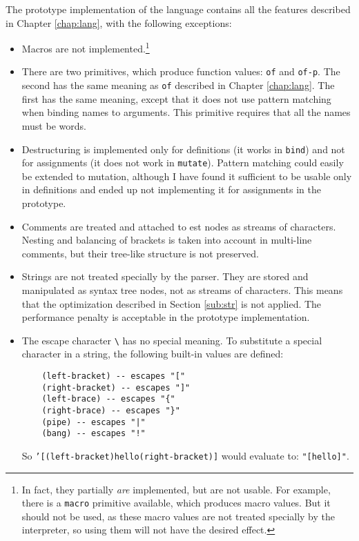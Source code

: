 The prototype implementation of the language contains all the features described in Chapter \ref{chap:lang}, with the following exceptions:
\begin{itemize}
    \item Macros are not implemented.\footnote{In fact, they partially \textit{are} implemented, but are not usable. For example, there is a \texttt{macro} primitive available, which produces macro values. But it should not be used, as these macro values are not treated specially by the interpreter, so using them will not have the desired effect.}
    \item There are two primitives, which produce function values: \texttt{of} and \texttt{of-p}. The second has the same meaning as \texttt{of} described in Chapter \ref{chap:lang}. The first has the same meaning, except that it does not use pattern matching when binding names to arguments. This primitive requires that all the names must be words.
    \item Destructuring is implemented only for definitions (it works in \texttt{bind}) and not for assignments (it does not work in \texttt{mutate}). Pattern matching could easily be extended to mutation, although I have found it sufficient to be usable only in definitions and ended up not implementing it for assignments in the prototype.
    \item Comments are treated and attached to \acrshort{est} nodes as streams of characters. Nesting and balancing of brackets is taken into account in multi-line comments, but their tree-like structure is not preserved.
    \item Strings are not treated specially by the parser. They are stored and manipulated as syntax tree nodes, not as streams of characters. This means that the optimization described in Section \ref{sub:str} is not applied. The performance penalty is acceptable in the prototype implementation. 
    \item The escape character \texttt{\textbackslash} has no special meaning. To substitute a special character in a string, the following built-in values are defined:
    \begin{lstlisting}
    (left-bracket) -- escapes "["
    (right-bracket) -- escapes "]"
    (left-brace) -- escapes "{"
    (right-brace) -- escapes "}"
    (pipe) -- escapes "|"
    (bang) -- escapes "!"
    \end{lstlisting}
    
    So \texttt{'[(left-bracket)hello(right-bracket)]} would evaluate to: \texttt{"[hello]"}.
\end{itemize}


